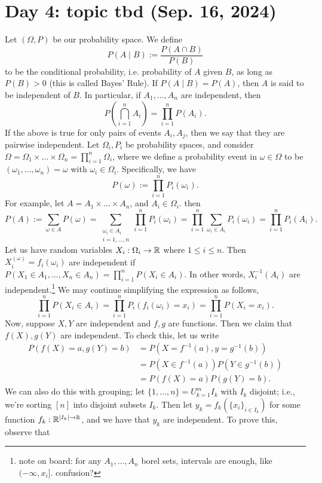 \section{Day 4: topic tbd (Sep. 16, 2024)}
Let $(\Omega, P)$ be our probability space. We define
\[ P (A \mid B) := \frac{P(A \cap B)}{P(B)} \]
to be the conditional probability, i.e. probability of $A$ given $B$, as long as $P(B) > 0$ (this is called Bayes' Rule). If $P(A \mid B) = P(A)$, then $A$ is said to be independent of $B$. In particular, if $A_1, \dots, A_n$ are independent, then
\[ P\left(\bigcap_{i = 1}^n A_i \right) = \prod_{i=1}^n P(A_i). \]
If the above is true for only pairs of events $A_i, A_j$, then we say that they are pairwise independent.
\medskip\newline
\noindent Let $\Omega_i, P_i$ be probability spaces, and consider $\Omega = \Omega_1 \times \dots \times \Omega_n = \prod_{i=1}^n \Omega_i$, where we define a probability event in $\omega \in \Omega$ to be $(\omega_1, \dots, \omega_n) = \omega$ with $\omega_i \in \Omega_i$. Specifically, we have
\[ P(\omega) := \prod_{i=1}^n P_i(\omega_i). \]
For example, let $A = A_1 \times \dots \times A_n$, and $A_i \in \Omega_i$. then
\[ P(A) := \sum_{\omega \in A} P(\omega) = \sum_{\substack{\omega_i \in A_i \\ i = 1, \dots, n}} \prod_{i=1}^n P_i(\omega_i) = \prod_{i=1}^n \sum_{\omega_i \in A_i} P_i(\omega_i) = \prod_{i=1}^n P_i(A_i). \]
Let us have random variables $X_i : \Omega_i \to \mathbb R$ where $1 \leq i \leq n$. Then $X_i^(\omega) = f_i(\omega_i)$ are independent if $P(X_1 \in A_1, \dots, X_n \in A_n) = \prod_{i=1}^n P(X_i \in A_i)$. In other words, $X_i^{-1}(A_i)$ are independent.\footnote{note on board: for any $A_1, \dots, A_n$ borel sets, intervals are enough, like $(-\infty, x_i]$. confusion?} We may continue simplifying the expression as follows,
\[ \prod_{i=1}^n P(X_i \in A_i) = \prod_{i=1}^n P_i(f_i(\omega_i) = x_i) = \prod_{i=1}^n P(X_i = x_i). \]
Now, suppose $X, Y$ are independent and $f, g$ are functions. Then we claim that $f(X), g(Y)$ are independent. To check this, let us write
\begin{align*}
    P(f(X) = a, g(Y) = b) &= P(X = f^{-1}(a), y = g^{-1}(b)) \\
    &= P(X \in f^{-1}(a)) P(Y \in g^{-1}(b)) \\
    &= P(f(X) = a) P(g(Y) = b).
\end{align*}
We can also do this with grouping; let $\{1, \dots, n\} = U_{k=1}^m I_k$ with $I_k$ disjoint; i.e., we're sorting $[n]$ into disjoint subsets $I_k$. Then let $y_k = f_k(\{x_i\}_{i \in I_k})$ for some function $f_k : \mathbb R^{\left\lvert I_k \right\rvert \to \mathbb R}$, and we have that $y_k$ are independent. To prove this, observe that
